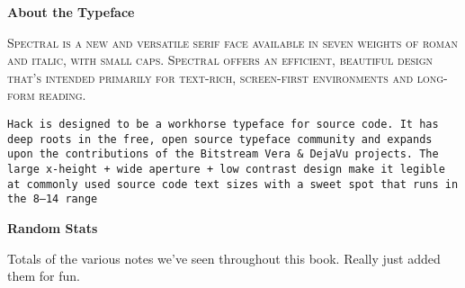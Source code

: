 
\clearpage
{}
\setlength{\parindent}{0em}

\begin{center}
{\Large\textbf{About the Typeface}}

\entryskip

\begin{minipage}{0.5\textwidth}\small
\textsc{Spectral is a new and versatile serif face available in seven weights of roman and italic, with small caps.
Spectral offers an efficient, beautiful design that’s intended primarily for text-rich, screen-first environments and long-form reading.}

\entryskip

\texttt{Hack is designed to be a workhorse typeface for source code.
It has deep roots in the free, open source typeface community and expands upon the contributions of the Bitstream Vera \& DejaVu projects.
The large x-height + wide aperture + low contrast design make it legible at commonly used source code text sizes with a sweet spot that runs in the 8--14 range}
\end{minipage}
\end{center}


\clearpage
{}
\begin{center}
{\Large\textbf{Random Stats}}

\entryskip

\begin{minipage}{0.6\textwidth}
Totals of the various notes we've seen throughout this book.
Really just added them for fun.
\begin{description}\scshape\large
    \item [Commentary Notes] \thecommcounter
    \item [Todo Notes] \thetodocounter
    \item [Thought Notes] \thethoughtcounter
    \item [Date Notes] \thedatecounter
    \item [Footnotes] \thefootcounter
    \item [Quotes] \theepicounter
\end{description}
\end{minipage}
\end{center}

